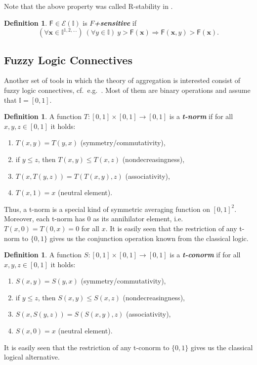 \documentclass[11pt]{article}\usepackage[]{graphicx}\usepackage[]{color}
\renewcommand{\emph}[1]{\textbf{\textsl{#1}}}
\newcommand{\vect}[1]{{\mathbf{#1}}}
\newcommand{\func}[1]{{\mathsf{#1}}}
\newcommand{\Ival}{\mathbb{I}}
\newcommand{\AnyPow}{^{1,2,\dots}}
\newcommand{\IvalAnyPow}{\mathbb{I}\AnyPow}
\theoremstyle{remark}
\theoremstyle{definition}
\newtheorem{definition}[theorem]{Definition}
\begin{document}
Note that the above property was called R-stability in \cite{BeliakovJames2013:FSS}.

\begin{definition}\label{Def:Wlasnosc_F+}
$\func{F}\in \mathcal{E}(\Ival)$ is
\emph{$F$+sensitive} if
\begin{equation*}
(\forall \vect{x}\in\IvalAnyPow)\ (\forall y\in\Ival)\ y>\func{F}(\vect{x})
\Longrightarrow
\func{F}(\vect{x},y)>\func{F}(\vect{x}).
\end{equation*}
\end{definition}


\subsection{Fuzzy Logic Connectives}\label{Sec:FLconnectives}

Another set of tools in which the theory of aggregation is interested
consist of fuzzy logic connectives, cf.~e.g.~\cite{KlirYuan1995:fuzzybook,BaczynskiJayaram2008:fuzzyimplications}.
Most of them are binary operations and assume that $\Ival=[0,1]$.

\begin{definition}\label{Def:tnorm}
A function $T: [0,1]\times[0,1]\to[0,1]$ is a \emph{t-norm}
if for all $x,y,z\in[0,1]$ it holds:
\begin{enumerate}
\item $T(x, y)=T(y, x)$ (symmetry/commutativity),
\item if $y \le z$, then $T(x, y)\le T(x, z)$ (nondecreasingness),
\item $T(x, T(y, z))=T(T(x, y), z)$ (associativity),
\item $T(x, 1)=x$ (neutral element).
\end{enumerate}
\end{definition}
Thus, a t-norm is a special kind of symmetric averaging function on $[0,1]^2$.
Moreover, each t-norm has $0$ as its annihilator element,
i.e.~$T(x,0)=T(0,x)=0$ for all $x$.
It is easily seen that the restriction of any t-norm to $\{0,1\}$ gives us the conjunction
operation known from the classical logic.



\bigskip
\begin{definition}\label{Def:tnorm}
A function $S: [0,1]\times[0,1]\to[0,1]$ is a \emph{t-conorm}
if for all $x,y,z\in[0,1]$ it holds:
\begin{enumerate}
\item $S(x, y)=S(y, x)$ (symmetry/commutativity),
\item if $y \le z$, then $S(x, y)\le S(x, z)$ (nondecreasingness),
\item $S(x, S(y, z))=S(S(x, y), z)$ (associativity),
\item $S(x, 0)=x$ (neutral element).
\end{enumerate}
\end{definition}
It is easily seen that the restriction of any t-conorm to $\{0,1\}$ gives us the
classical logical alternative.
\end{document}
